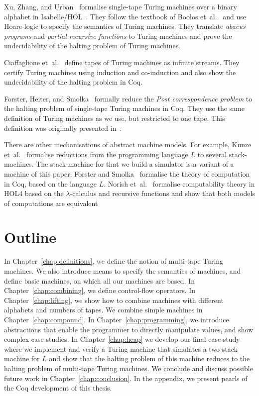 Xu, Zhang, and Urban~\cite{Xu:2013:MTM:2529315.2529331} formalise single-tape Turing machines over a binary alphabet in
Isabelle/HOL~\cite{nipkow2002isabelle}.  They follow the textbook of Boolos et~al.~\cite{boolos2007computability} and use Hoare-logic to specify the
semantics of Turing machines.  They translate \textit{abacus programs} and \textit{partial recursive functions} to Turing machines and prove the
undecidability of the halting problem of Turing machines.

Ciaffaglione et~al.~\cite{Ciaffaglione:2016:TTC:2956213.2956306} define tapes of Turing machines as infinite streams.  They certify Turing machines
using induction and co-induction and also show the undecidability of the halting problem in Coq.

Forster, Heiter, and Smolka~\cite{PCPITP} formally reduce the \textit{Post correspondence problem} to the halting problem of single-tape Turing
machines in Coq.  They use the same definition of Turing machines as we use, but restricted to one tape.  This definition was originally presented
in~\cite{asperti2012}.

There are other mechanisations of abstract machine models.  For example, Kunze et~al.~\cite{KunzeEtAl:2018:Formal} formalise reductions from the
programming language $L$ to several stack-machines.  The stack-machine for that we build a simulator is a variant of a machine of this paper.  Forster
and Smolka~\cite{ForsterSmolka17} formalise the theory of computation in Coq, based on the language $L$.  Norish
et~al.~\cite{NorrishComputabilityTheory} formalise computability theory in HOL4 based on the $\lambda$-calculus and recursive functions and show that
both models of computations are equivalent



\section{Outline}
\label{sec:outline}

In Chapter~\ref{chap:definitions}, we define the notion of multi-tape Turing machines.  We also introduce means to specify the semantics of machines,
and define basic machines, on which all our machines are based.  In Chapter~\ref{chap:combining}, we define control-flow operators.  In
Chapter~\ref{chap:lifting}, we show how to combine machines with different alphabets and numbers of tapes.  We combine simple machines in
Chapter~\ref{chap:compound}.  In Chapter~\ref{chap:programming}, we introduce abstractions that enable the programmer to directly manipulate values,
and show complex case-studies.  In Chapter~\ref{chap:heap} we develop our final case-study where we implement and verify a Turing machine that
simulates a two-stack machine for $L$ and show that the halting problem of this machine reduces to the halting problem of multi-tape Turing machines.
We conclude and discuss possible future work in Chapter~\ref{chap:conclusion}.  In the appendix, we present pearls of the Coq development of this
thesis.

